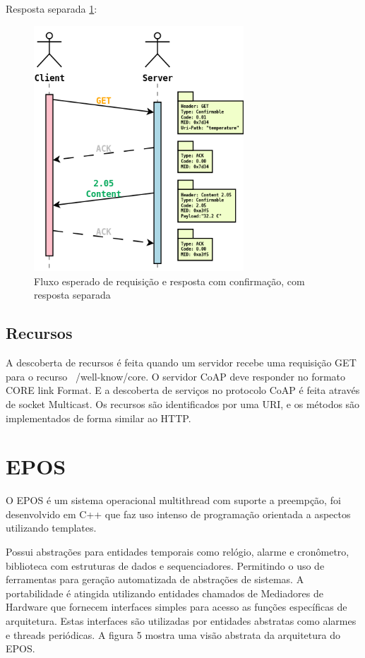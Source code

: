 Resposta separada \ref{fig:d}:
\begin{figure}
   \label{fig:d}
   \centering
   \includegraphics[width=0.7\textwidth]{figuras/separateresponse.png}
   \caption{Fluxo esperado de requisi\c{c}\~ao e resposta com confirma\c{c}\~ao, com resposta separada}
\end{figure}
 

\subsection{Recursos}
A descoberta de recursos \'e feita quando um servidor recebe uma requisi\c{c}\~ao GET para o recurso ~/well-know/core. O servidor CoAP deve responder no formato CORE link Format.\cite{rfc6690} E a descoberta de servi\c{c}os no protocolo CoAP \'e feita atrav\'es de socket Multicast. Os recursos s\~ao identificados por uma URI, e os m\'etodos s\~ao implementados de forma similar ao HTTP.



\section{EPOS}
O EPOS \'e um sistema operacional multithread com suporte a preemp\c{c}\~ao, foi desenvolvido em C++ que faz uso intenso de programa\c{c}\~ao orientada a aspectos utilizando templates.

Possui abstra\c{c}\~oes para entidades temporais como rel\'ogio, alarme e cron\^ometro, biblioteca com estruturas de dados e sequenciadores. Permitindo o uso de ferramentas para gera\c{c}\~ao automatizada de abstra\c{c}\~oes de sistemas. A portabilidade \'e atingida utilizando entidades chamados de Mediadores de Hardware que fornecem interfaces simples para acesso as fun\c{c}\~oes espec\'ificas de arquitetura. Estas interfaces s\~ao utilizadas por entidades abstratas como alarmes e threads peri\'odicas. A figura 5 mostra uma vis\~ao abstrata da arquitetura do EPOS.

